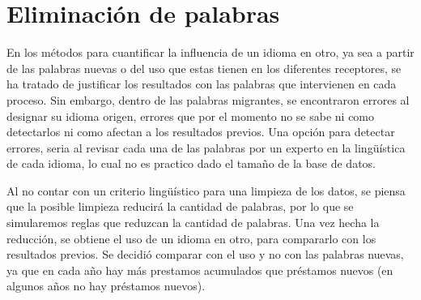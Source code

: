 \chapter{Eliminación de palabras}

En los métodos para cuantificar la influencia de un idioma en otro, ya sea a
partir de las palabras nuevas o del uso que estas tienen en los diferentes
receptores, se ha tratado de justificar los resultados con las palabras que
intervienen en cada proceso. Sin embargo, dentro de las palabras migrantes, se
encontraron errores al designar su idioma origen, errores que por el momento no
se sabe ni como detectarlos ni como afectan a los resultados previos.  Una
opción para detectar errores, seria al revisar cada una de las palabras por un
experto en la lingüística de cada idioma, lo cual no es practico dado el tamaño
de la base de datos.

Al no contar con un criterio lingüístico para una limpieza de los datos, se
piensa que la posible limpieza reducirá la cantidad de palabras, por lo que se
simularemos reglas  que reduzcan la cantidad de palabras.  Una vez hecha la
reducción, se obtiene el uso de un idioma en otro, para compararlo con los
resultados previos. Se decidió comparar con el uso y no con las palabras
nuevas, ya que en cada año hay más prestamos acumulados que préstamos nuevos
(en algunos años no hay préstamos nuevos).
 


